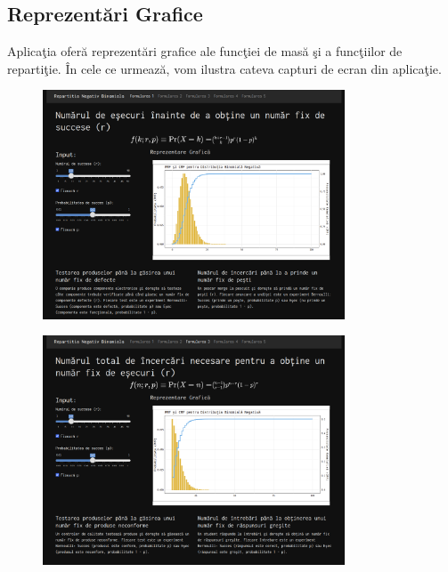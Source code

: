 \documentclass[a4paper,11pt]{article}
\begin{document}
\subsection*{Reprezent\u{a}ri Grafice}

Aplica\c{t}ia ofer\u{a} reprezent\u{a}ri grafice ale func\c{t}iei de mas\u{a} \c{s}i a func\c{t}iilor de reparti\c{t}ie. În cele ce urmeaz\u{a}, vom ilustra cateva capturi de ecran din aplica\c{t}ie.

\begin{figure}[h!]
  \centering
  \includegraphics[width=0.8\textwidth]{./img/6.png}
  \label{fig:imaginea_ta_3}
\end{figure}

\begin{figure}[h!]
  \centering
  \includegraphics[width=0.8\textwidth]{./img/7.png}
  \label{fig:imaginea_ta_3}
\end{figure}
\end{document}
